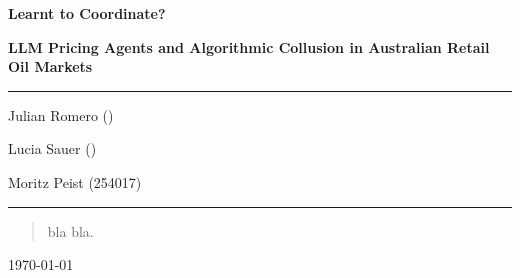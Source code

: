 \documentclass[12pt]{article}
\begin{document}
\begin{titlepage}
	\centering
	\par\vspace{1cm}
	{\huge\bfseries Learnt to Coordinate?\par}
    {\large\bfseries LLM Pricing Agents and Algorithmic Collusion in Australian Retail Oil Markets\par}
	\vspace{1cm}
    \noindent\rule{\textwidth}{1pt}
    {\Large Julian Romero ()\par}
    {\Large Lucia Sauer ()\par}
	{\Large Moritz Peist (254017)\par}
    \noindent\rule{\textwidth}{1pt}
    \vfill
    \begin{abstract}
        \noindent
        bla bla.
    \end{abstract}
	\vfill
	{\large \today\par}
\end{titlepage}

\tableofcontents
\thispagestyle{empty}

\newpage
\addtocounter{page}{-1}

\newpage

\newpage

\newpage

\newpage

\newpage


\newpage
\printbibliography[heading=bibintoc,title={References}]

\newpage

\end{document}
